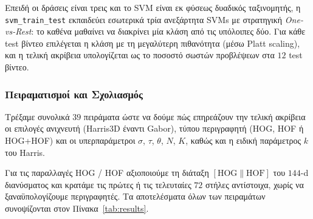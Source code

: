 \documentclass[12pt, a4paper]{article}
\begin{document}
Επειδή οι δράσεις είναι τρεις και το SVM είναι εκ φύσεως δυαδικός
ταξινομητής, η \texttt{svm\_train\_test} εκπαιδεύει εσωτερικά τρία
ανεξάρτητα SVMs με στρατηγική \emph{One-vs-Rest}: το καθένα μαθαίνει να
διακρίνει μία κλάση από τις υπόλοιπες δύο. Για κάθε test βίντεο
επιλέγεται η κλάση με τη μεγαλύτερη πιθανότητα (μέσω Platt scaling), και
η τελική ακρίβεια υπολογίζεται ως το ποσοστό σωστών προβλέψεων στα $12$
test βίντεο.

\subsubsection{Πειραματισμοί και Σχολιασμός}

Τρέξαμε συνολικά $39$ πειράματα ώστε να δούμε πώς επηρεάζουν την τελική
ακρίβεια οι επιλογές ανιχνευτή (Harris3D έναντι Gabor), τύπου περιγραφητή (HOG, HOF ή HOG+HOF) και οι υπερπαράμετροι $\sigma$, $\tau$, $\theta$, $N$, $K$, καθώς και η ειδική παράμετρος $k$ του Harris. 

Για τις παραλλαγές HOG / HOF αξιοποιούμε τη διάταξη $[\text{HOG}\|\text{HOF}]$ του $144$-d διανύσματος και κρατάμε τις πρώτες ή τις τελευταίες $72$ στήλες αντίστοιχα, χωρίς να ξαναϋπολογίζουμε περιγραφητές. Τα αποτελέσματα όλων των πειραμάτων συνοψίζονται στον Πίνακα~\ref{tab:results}.
\end{document}
